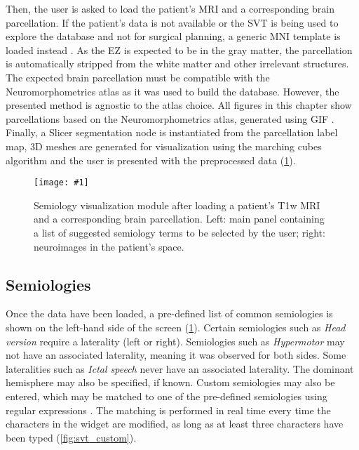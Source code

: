 Then, the user is asked to load the patient's \ac{MRI} and a corresponding brain parcellation.
If the patient's data is not available or the \ac{SVT} is being used to explore the database and not for surgical planning, a generic \ac{MNI} template is loaded instead \cite{fonov_unbiased_2009}.
As the \ac{EZ} is expected to be in the gray matter, the parcellation is automatically stripped from the white matter and other irrelevant structures.
The expected brain parcellation must be compatible with the Neuromorphometrics atlas as it was used to build the \svtdatabase database.
However, the presented method is agnostic to the atlas choice.
All figures in this chapter show parcellations based on the Neuromorphometrics atlas, generated using \ac{GIF} \cite{cardoso_geodesic_2015}.
Finally, a Slicer segmentation node is instantiated from the parcellation label map, 3D meshes are generated for visualization using the marching cubes algorithm \cite{lorensen_marching_1987,pinter_polymorph_2019} and the user is presented with the preprocessed data (\cref{fig:svt_loaded}).

\newcommand{\svtscreenshot}[1]{
  \texttt{[image: \#1]}
}

\begin{figure}
  \centering
  \svtscreenshot{svt_loaded_patient}
  \caption[Semiology visualization module after loading a patient's data]{
  Semiology visualization module after loading a patient's \ac{T1w} \ac{MRI} and a corresponding brain parcellation.
  Left: main panel containing a list of suggested semiology terms to be selected by the user;
  right: neuroimages in the patient's space.
  }
  \label{fig:svt_loaded}
\end{figure}


\subsection{Semiologies}

Once the data have been loaded, a pre-defined list of common semiologies is shown on the left-hand side of the screen (\cref{fig:svt_loaded}).
Certain semiologies such as \textit{Head version} require a laterality (left or right).
Semiologies such as \textit{Hypermotor} may not have an associated laterality, meaning it was observed for both sides.
Some lateralities such as \textit{Ictal speech} never have an associated laterality.
The dominant hemisphere may also be specified, if known.
Custom semiologies may also be entered, which may be matched to one of the pre-defined semiologies using regular expressions \cite{alim-marvasti_mapping_2021}.
The matching is performed in real time every time the characters in the widget are modified, as long as at least three characters have been typed (\cref{fig:svt_custom}).

